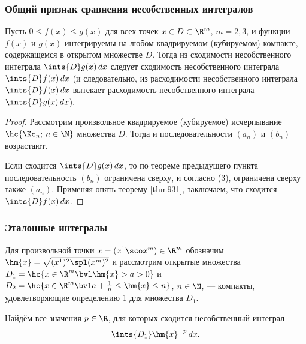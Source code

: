 \documentclass[a4paper]{article}
\begin{document}
\subsubsection{Общий признак сравнения несобственных интегралов}

\begin{theorem}
Пусть $0\le f(x)\le g(x)$ для всех точек $x\in D\subset\R^m$,
$m=2,3$, и функции $f(x)$ и $g(x)$ интегрируемы на любом
квадрируемом (кубируемом) компакте, содержащемся в открытом
множестве $D$. Тогда из сходимости несобственного интеграла
$\ints{D}g(x)\,dx$ следует сходимость несобственного интеграла
$\ints{D}f(x)\,dx$ (и следовательно, из расходимости несобственного
интеграла $\ints{D}f(x)\,dx$ вытекает расходимость несобственного
интеграла $\ints{D}g(x)\,dx$).
\end{theorem}

\begin{proof}
Рассмотрим произвольное квадрируемое (кубируемое) исчерпывание
$\hc{\Kc_n;\,n\in\N}$ множества $D$. Тогда 
и последовательности $(a_n)$ и $(b_n)$ возрастают.

Если сходится $\ints{D}g(x)\,dx$, то по теореме предыдущего пункта
последовательность $(b_n)$ ограничена сверху, и согласно (3),
ограничена сверху также $(a_n)$. Применяя опять теорему
\ref{thm931}, заключаем, что сходится $\ints{D}f(x)\,dx$.
\end{proof}

\subsubsection{Эталонные интегралы}

Для произвольной точки $x=(x^1\sco x^m)\in\R^m$ обозначим
$\hm{x}=\sqrt{(x^1)^2\spl(x^m)^2}$ и рассмотрим открытые множества
$D_1=\hc{x\in\R^m \bvl \hm{x}>a>0}$ и $D_2=\hc{x\in\R^m \bvl
a+\frac1n \le \hm{x} \le n}$, $n\in\N$, --- компакты,
удовлетворяющие определению 1 для множества $D_1$.

\begin{ex}
Найдём все значения $p\in\R$, для которых сходится несобственный
интеграл $$\ints{D_1}\hm{x}^{-p}\,dx.$$
\end{ex}
\end{document}
